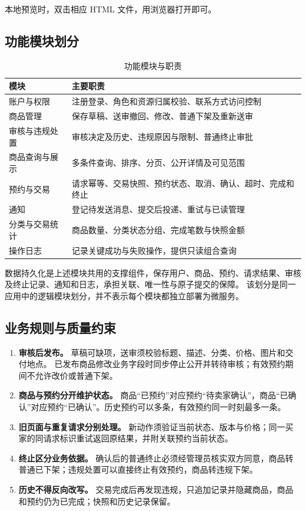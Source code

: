 \documentclass[UTF8,zihao=-4,a4paper,fontset=none]{ctexart}
\begin{document}
本地预览时，双击相应 HTML 文件，用浏览器打开即可。

\subsection{功能模块划分}
\begin{table}[H]\centering\small
\caption{功能模块与职责}
\begin{tabularx}{\linewidth}{@{}p{32mm}Y@{}}\toprule
模块 & 主要职责\\\midrule
账户与权限 & 注册登录、角色和资源归属校验、联系方式访问控制\\
商品管理 & 保存草稿、送审撤回、修改、普通下架及重新送审\\
审核与违规处置 & 审核决定及历史、违规原因与限制、普通终止审批\\
商品查询与展示 & 多条件查询、排序、分页、公开详情及可见范围\\
预约与交易 & 请求幂等、交易快照、预约状态、取消、确认、超时、完成和终止\\
通知 & 登记待发送消息、提交后投递、重试与已读管理\\
分类与交易统计 & 商品数量、分类状态分组、完成笔数与快照金额\\
操作日志 & 记录关键成功与失败操作，提供只读组合查询\\\bottomrule
\end{tabularx}
\end{table}

数据持久化是上述模块共用的支撑组件，保存用户、商品、预约、请求结果、审核及终止记录、通知和日志，承担关联、唯一性与原子提交的保障。
该划分是同一应用中的逻辑模块划分，并不表示每个模块都独立部署为微服务。


\clearpage

\subsection{业务规则与质量约束}
\begin{enumerate}
\item \textbf{审核后发布。} 草稿可缺项，送审须校验标题、描述、分类、价格、图片和交付地点。
已发布商品修改业务字段时同步停止公开并转待审核；有效预约期间不允许改价或普通下架。
\item \textbf{商品与预约分开维护状态。} 商品“已预约”对应预约“待卖家确认”，商品“已确认”对应预约“已确认”。历史预约可以多条，有效预约同一时刻最多一条。
\item \textbf{旧页面与重复请求分别处理。} 新动作须验证当前状态、版本与价格；同一买家的同请求标识重试返回原结果，并附关联预约当前状态。
\item \textbf{终止区分业务依据。} 确认后的普通终止必须经管理员核实双方同意，商品转普通已下架；违规处置可以直接终止有效预约，商品转违规下架。
\item \textbf{历史不得反向改写。} 交易完成后再发现违规，只追加记录并隐藏商品，商品和预约仍为已完成；快照和历史记录保留。
\end{enumerate}
\end{document}
